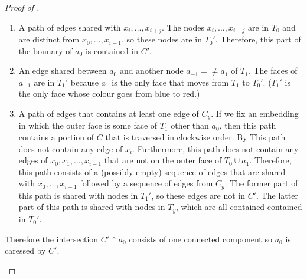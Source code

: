 \documentclass{patmorin}
\begin{document}
\begin{proof}[Proof of ]
\begin{enumerate}
\begin{enumerate}
     \item A path of edges shared with $x_i,\ldots,x_{i+j}$.
      The nodes $x_i,\ldots,x_{i+j}$ are in $T_0$ and are distinct from
      $x_0,\ldots,x_{i-1}$, so these nodes are in $T_0'$.
      Therefore, this part of the bounary of $a_0$ is contained in $C'$.

     \item An edge shared between $a_0$ and another node $a_{-1}=\neq
     a_1$ of $T_1$. The faces of $a_{-1}$ are in $T_1'$ because $a_1$
     is the only face that moves from $T_1$ to $T_0'$. ($T_1'$ is the
     only face whose colour goes from blue to red.)

     \item A path of edges that contains at least one edge of $C_y$. If
     we fix an embedding in which the outer face is some face of $T_1$
     other than $a_0$, then this path contains a portion of $C$ that
     is traversed in clockwise order. By 
     This path does not contain any edge of $x_i$.  Furthermore, this
     path does not contain any edges of $x_0,x_1,\ldots,x_{i-1}$ that
     are not on the outer face of $T_0\cup a_1$.  Therefore, this path
     consists of a (possibly empty) sequence of edges that are shared with
     $x_0,\ldots,x_{i-1}$ followed by a sequence of edges from $C_y$. The
     former part of this path is shared with nodes in $T_1'$, so these
     edges are not in $C'$.  The latter part of this path is shared with
     nodes in $T_y$, which are all contained contained in $T_0'$.
  \end{enumerate} 
  Therefore the intersection $C'\cap a_0$ consists of one connected
  component so $a_0$ is caressed by $C'$. \qedhere
\end{enumerate}
%  
%

\end{proof}
\end{document}

